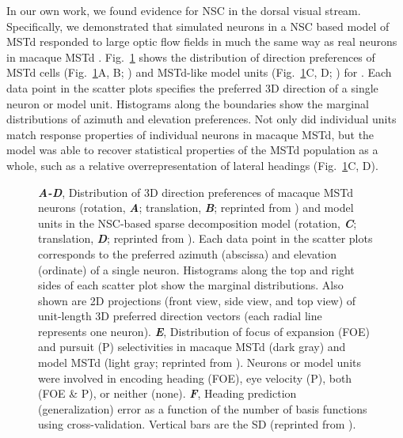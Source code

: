 In our own work, we found evidence for \ac{NSC} in the dorsal visual stream.
Specifically, we demonstrated that simulated neurons 
in a \ac{NSC} based model of \ac{MSTd} 
responded to  large optic flow fields in much the same way as real neurons in macaque \ac{MSTd} \cite{Beyeler2016}.
Fig.~\ref{fig:NMF|MSTd} shows the distribution of direction preferences
of \ac{MSTd} cells (Fig.~\ref{fig:NMF|MSTd}A, B; \cite{Takahashi2007})
and \ac{MSTd}-like model units (Fig.~\ref{fig:NMF|MSTd}C, D; \cite{Beyeler2016})
for .
Each data point in the scatter plots specifies the preferred 3D direction
of a single neuron or model unit.
Histograms along the boundaries show the marginal distributions of azimuth
and elevation preferences.
Not only did individual units match response properties of individual neurons
in macaque \ac{MSTd},
but the model was able to recover statistical properties of the \ac{MSTd}
population as a whole, such as a relative overrepresentation of lateral
headings (Fig.~\ref{fig:NMF|MSTd}C, D).

\begin{figure}[h]
	\centering
    \caption{
    \textbf{\emph{A-D}},
         Distribution of 3D direction preferences of macaque \ac{MSTd} neurons
         (rotation, \textbf{\emph{A}}; translation, \textbf{\emph{B}}; 
         reprinted  from \cite{Takahashi2007})
         and model units in the \ac{NSC}-based sparse decomposition model
         (rotation, \textbf{\emph{C}}; translation, \textbf{\emph{D}}; 
         reprinted  from \cite{Beyeler2016}).
         Each data point in the scatter plots corresponds to the preferred azimuth
         (abscissa) and elevation (ordinate) of a single neuron.
         Histograms along the top and right sides of each scatter plot show the
         marginal distributions.
         Also shown are 2D projections (front view, side view, and top view)
         of unit-length 3D preferred direction vectors (each radial line represents
         one neuron).
    \textbf{\emph{E}},
         Distribution of focus of expansion (FOE) and pursuit (P) selectivities
         in macaque \ac{MSTd} (dark gray) and model \ac{MSTd} (light gray;
         reprinted  from \cite{Beyeler2016}).
         Neurons or model units were involved in encoding heading (FOE),
         eye velocity (P), both (FOE \& P), or neither (none).
    \textbf{\emph{F}},
         Heading prediction (generalization) error as a function of the
         number of basis functions using cross-validation.
         Vertical bars are the SD (reprinted 
         from \cite{Beyeler2016}).
    }
	\label{fig:NMF|MSTd}
\end{figure}

